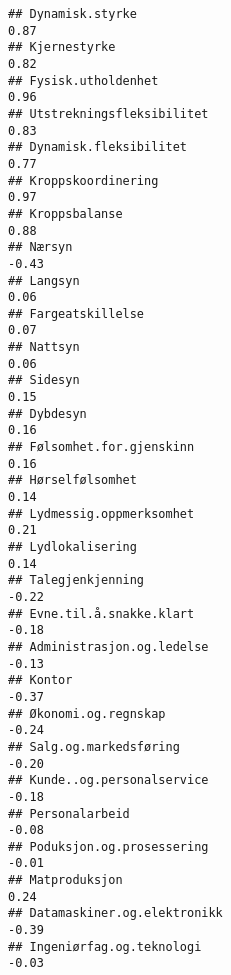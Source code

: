 \documentclass[
]{article}
\begin{document}
\begin{verbatim}
## Dynamisk.styrke                                                                   0.87
## Kjernestyrke                                                                      0.82
## Fysisk.utholdenhet                                                                0.96
## Utstrekningsfleksibilitet                                                         0.83
## Dynamisk.fleksibilitet                                                            0.77
## Kroppskoordinering                                                                0.97
## Kroppsbalanse                                                                     0.88
## Nærsyn                                                                           -0.43
## Langsyn                                                                           0.06
## Fargeatskillelse                                                                  0.07
## Nattsyn                                                                           0.06
## Sidesyn                                                                           0.15
## Dybdesyn                                                                          0.16
## Følsomhet.for.gjenskinn                                                           0.16
## Hørselfølsomhet                                                                   0.14
## Lydmessig.oppmerksomhet                                                           0.21
## Lydlokalisering                                                                   0.14
## Talegjenkjenning                                                                 -0.22
## Evne.til.å.snakke.klart                                                          -0.18
## Administrasjon.og.ledelse                                                        -0.13
## Kontor                                                                           -0.37
## Økonomi.og.regnskap                                                              -0.24
## Salg.og.markedsføring                                                            -0.20
## Kunde..og.personalservice                                                        -0.18
## Personalarbeid                                                                   -0.08
## Poduksjon.og.prosessering                                                        -0.01
## Matproduksjon                                                                     0.24
## Datamaskiner.og.elektronikk                                                      -0.39
## Ingeniørfag.og.teknologi                                                         -0.03

\end{verbatim}
\end{document}
